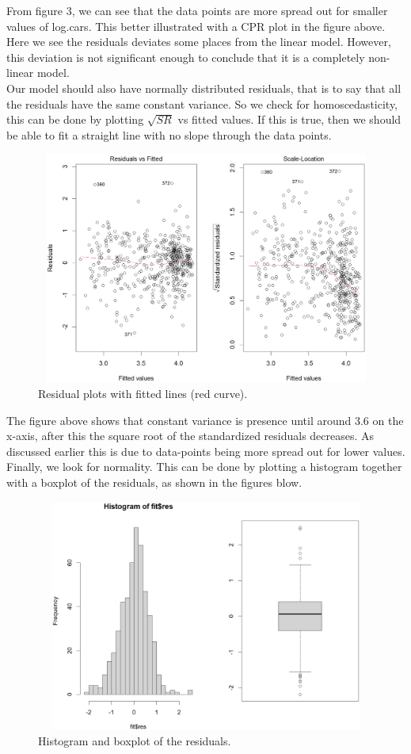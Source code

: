 \documentclass[a4paper,12pt]{article}
\begin{document}
From figure 3, we can see that the data points are more spread out for smaller values of log.cars. This better illustrated with a CPR plot in the figure above. Here we see the residuals deviates some places from the linear model. However, this deviation is not significant enough to conclude that it is a completely non-linear model.\\

Our model should also have normally distributed residuals, that is to say that all the residuals have the same constant variance. So we check for homoscedasticity, this can be done by plotting $\sqrt{SR}$ vs fitted values. If this is true, then we should be able to fit a straight line with no slope through the data points. 

\begin{figure}[H]
\centerline{\includegraphics[width=4.5in, height=3in]{residualsStandard(C).png}}
\caption{Residual plots with fitted lines (red curve).}
\label{fig}
\end{figure}

The figure above shows that constant variance is presence until around 3.6 on the x-axis, after this the square root of the standardized residuals decreases. As discussed earlier this is due to data-points being more spread out for lower values.\\

Finally, we look for normality. This can be done by plotting a histogram together with a boxplot of the residuals, as shown in the figures blow. 

\begin{figure}[H]
\centerline{\includegraphics[width=4.5in, height=3in]{HistogramBoxplot(C).png}}
\caption{Histogram and boxplot of the residuals.}
\label{fig}
\end{figure}
\end{document}

